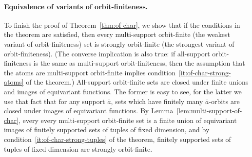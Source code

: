 %
%




\paragraph*{Equivalence of variants of orbit-finiteness.} To finish the proof of Theorem~\ref{thm:of-char}, we show that if the conditions in the theorem are satisfied, then every multi-support orbit-finite (the weakest variant of orbit-finiteness) set is strongly orbit-finite (the strongest variant of orbit-finiteness). (The converse implication is also true: if all-support orbit-finiteness is the same as multi-support orbit-finiteness, then the assumption that the atoms are multi-support orbit-finite implies condition~\ref{it:of-char-strong-atoms} of the theorem.) All-support orbit-finite sets are closed under finite unions and images of equivariant functions. The former is easy to see, for the latter we use that fact that for any support $\bar a$, sets which have finitely many $\bar a$-orbits are closed under images of equivariant functions. By Lemma~\ref{lem:multi-support-of-char}, every every multi-support orbit-finite set is a finite union of equivariant images of finitely supported sets of tuples of fixed dimension, and by condition~\ref{it:of-char-strong-tuples} of the theorem, finitely supported sets of tuples of fixed dimension are strongly orbit-finite.

